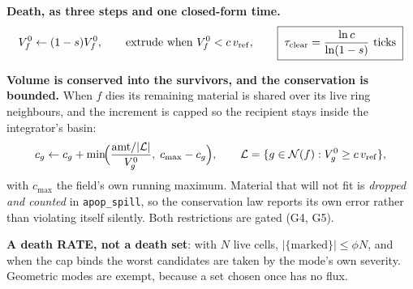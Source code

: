 \documentclass[10pt,a4paper]{article}
\newcommand{\code}[1]{\texttt{#1}}
\begin{document}
\textbf{Death, as three steps and one closed-form time.}
%
\begin{equation}
V^0_f \leftarrow (1-s)V^0_f,\qquad \text{extrude when } V^0_f<c\,v_{\rm ref},\qquad
\boxed{\;\tau_{\rm clear}=\frac{\ln c}{\ln(1-s)}\ \text{ticks}\;}
\label{eq:clear}
\end{equation}

\textbf{Volume is conserved into the survivors, and the conservation is bounded.} When $f$ dies its
remaining material is shared over its live ring neighbours, and the increment is capped so the
recipient stays inside the integrator's basin:
%
\begin{equation}
c_g \leftarrow c_g + \min\!\Bigl(\frac{\text{amt}/|\mathcal L|}{V^0_g},\;
c_{\max}-c_g\Bigr),\qquad
\mathcal L=\{g\in\mathcal N(f): V^0_g\ge c\,v_{\rm ref}\},
\label{eq:conserve}
\end{equation}
%
with $c_{\max}$ the field's own running maximum. Material that will not fit is \emph{dropped and
counted} in \code{apop\_spill}, so the conservation law reports its own error rather than
violating itself silently. Both restrictions are gated (G4, G5).

\textbf{A death RATE, not a death set}: with $N$ live cells, $|\{\text{marked}\}|\le\phi N$, and when
the cap binds the worst candidates are taken by the mode's own severity. Geometric modes are exempt,
because a set chosen once has no flux.
\end{document}
